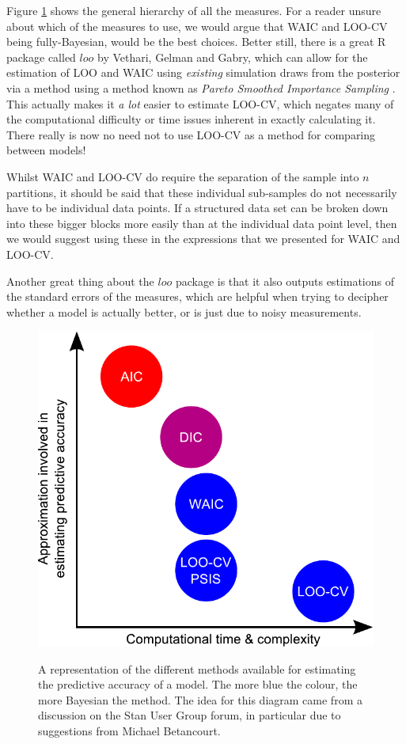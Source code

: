 \documentclass[11pt,fullpage]{book}
\begin{document}
Figure \ref{fig:Evaluation_criteriaDiagram} shows the general hierarchy of all the measures. For a reader unsure about which of the measures to use, we would argue that WAIC and LOO-CV being fully-Bayesian, would be the best choices. Better still, there is a great R package called $loo$ by Vethari, Gelman and Gabry, which can allow for the estimation of LOO and WAIC using \textit{existing} simulation draws from the posterior via a method using a method known as \textit{Pareto Smoothed Importance Sampling} \cite{vehtari2015efficient}. This actually makes it \textit{a lot} easier to estimate LOO-CV, which negates many of the computational difficulty or time issues inherent in exactly calculating it. There really is now no need not to use LOO-CV as a method for comparing between models! 

Whilst WAIC and LOO-CV do require the separation of the sample into $n$ partitions, it should be said that these individual sub-samples do not necessarily have to be individual data points. If a structured data set can be broken down into these bigger blocks more easily than at the individual data point level, then we would suggest using these in the expressions that we presented for WAIC and LOO-CV.

Another great thing about the $loo$ package is that it also outputs estimations of the standard errors of the measures, which are helpful when trying to decipher whether a model is actually better, or is just due to noisy measurements.

\begin{figure}
\centering
\scalebox{0.4} 
{\includegraphics{Evaluation_criteriaDiagram.pdf}}
\caption{A representation of the different methods available for estimating the predictive accuracy of a model. The more blue the colour, the more Bayesian the method. The idea for this diagram came from a discussion on the Stan User Group forum, in particular due to suggestions from Michael Betancourt.}\label{fig:Evaluation_criteriaDiagram}
\end{figure}
\end{document}
